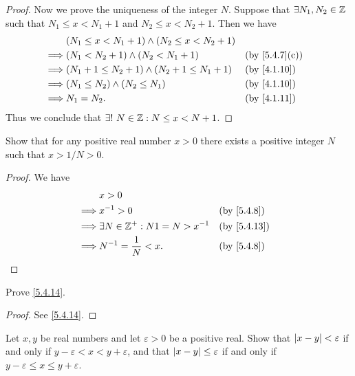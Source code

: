 \begin{proof}
  Now we prove the uniqueness of the integer \(N\).
  Suppose that \(\exists N_1, N_2 \in \mathbb{Z}\) such that \(N_1 \leq x < N_1 + 1\) and \(N_2 \leq x < N_2 + 1\).
  Then we have
  \begin{align*}
             & (N_1 \leq x < N_1 + 1) \land (N_2 \leq x < N_2 + 1)                                  \\
    \implies & (N_1 < N_2 + 1) \land (N_2 < N_1 + 1)               &  & \text{(by \cref{5.4.7}(c))} \\
    \implies & (N_1 + 1 \leq N_2 + 1) \land (N_2 + 1 \leq N_1 + 1) &  & \by{4.1.10}                 \\
    \implies & (N_1 \leq N_2) \land (N_2 \leq N_1)                 &  & \by{4.1.10}                 \\
    \implies & N_1 = N_2.                                          &  & \by{4.1.11}
  \end{align*}
  Thus we conclude that \(\exists!\ N \in \mathbb{Z} : N \leq x < N + 1\).
\end{proof}

\begin{ex}\label{ex:5.4.4}
  Show that for any positive real number \(x > 0\) there exists a positive integer \(N\) such that \(x > 1 / N > 0\).
\end{ex}

\begin{proof}
  We have
  \begin{align*}
             & x > 0                                                 \\
    \implies & x^{-1} > 0                           &  & \by{5.4.8}  \\
    \implies & \exists N \in \Z^+ : N1 = N > x^{-1} &  & \by{5.4.13} \\
    \implies & N^{-1} = \dfrac{1}{N} < x.           &  & \by{5.4.8}
  \end{align*}
\end{proof}

\begin{ex}\label{ex:5.4.5}
  Prove \cref{5.4.14}.
\end{ex}

\begin{proof}
  See \cref{5.4.14}.
\end{proof}

\begin{ex}\label{ex:5.4.6}
  Let \(x, y\) be real numbers and let \(\varepsilon > 0\) be a positive real.
  Show that \(\left\lvert x - y\right\rvert < \varepsilon\) if and only if \(y - \varepsilon < x < y + \varepsilon\), and that \(\left\lvert x - y\right\rvert \leq \varepsilon\) if and only if \(y - \varepsilon \leq x \leq y + \varepsilon\).
\end{ex}

